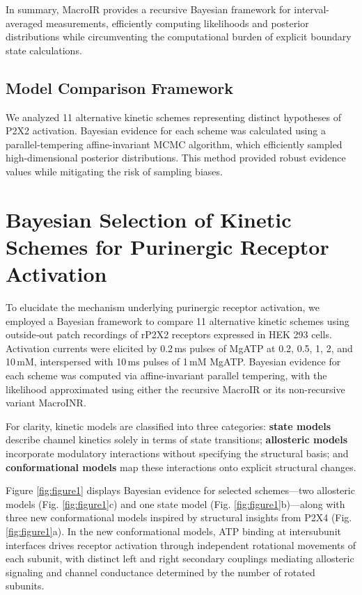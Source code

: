 \documentclass[pdflatex,sn-nature]{sn-jnl}%
\theoremstyle{thmstyleone}%
\theoremstyle{thmstyletwo}%
\theoremstyle{thmstylethree}%
\begin{document}
In summary, MacroIR provides a recursive Bayesian framework for interval-averaged measurements, efficiently computing likelihoods and posterior distributions while circumventing the computational burden of explicit boundary state calculations.
\subsection{Model Comparison Framework}
We analyzed 11 alternative kinetic schemes representing distinct hypotheses of P2X2 activation. Bayesian evidence for each scheme was calculated using a parallel-tempering affine-invariant MCMC algorithm, which efficiently sampled high-dimensional posterior distributions. This method provided robust evidence values while mitigating the risk of sampling biases. 


\section{Bayesian Selection of Kinetic Schemes for Purinergic Receptor Activation}

To elucidate the mechanism underlying purinergic receptor activation, we employed a Bayesian framework to compare 11 alternative kinetic schemes using outside‐out patch recordings of rP2X2 receptors expressed in HEK 293 cells. Activation currents were elicited by 0.2\,ms pulses of MgATP at 0.2, 0.5, 1, 2, and 10\,mM, interspersed with 10\,ms pulses of 1\,mM MgATP. Bayesian evidence for each scheme was computed via affine-invariant parallel tempering, with the likelihood approximated using either the recursive MacroIR or its non-recursive variant MacroINR.

For clarity, kinetic models are classified into three categories: \textbf{state models} describe channel kinetics solely in terms of state transitions; \textbf{allosteric models} incorporate modulatory interactions without specifying the structural basis; and \textbf{conformational models} map these interactions onto explicit structural changes.

Figure \ref{fig:figure1} displays Bayesian evidence for selected schemes—two allosteric models (Fig. \ref{fig:figure1}c) and one state model (Fig. \ref{fig:figure1}b)—along with three new conformational models inspired by structural insights from P2X4 (Fig. \ref{fig:figure1}a). In the new conformational models, ATP binding at intersubunit interfaces drives receptor activation through independent rotational movements of each subunit, with distinct left and right secondary couplings mediating allosteric signaling and channel conductance determined by the number of rotated subunits.
\end{document}
